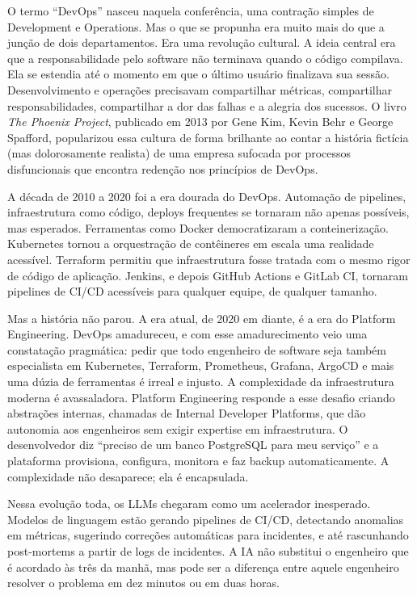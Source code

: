 O termo ``DevOps'' nasceu naquela conferência, uma contração simples de
Development e Operations. Mas o que se propunha era muito mais do que a
junção de dois departamentos. Era uma revolução cultural. A ideia central era que
a responsabilidade pelo software não terminava quando o código compilava. Ela se
estendia até o momento em que o último usuário finalizava sua sessão. Desenvolvimento
e operações precisavam compartilhar métricas, compartilhar responsabilidades,
compartilhar a dor das falhas e a alegria dos sucessos. O livro \emph{The Phoenix
Project}, publicado em 2013 por Gene Kim, Kevin Behr e George Spafford, popularizou
essa cultura de forma brilhante ao contar a história fictícia (mas dolorosamente
realista) de uma empresa sufocada por processos disfuncionais que encontra redenção
nos princípios de DevOps.

A década de 2010 a 2020 foi a era dourada do DevOps. Automação de pipelines,
infraestrutura como código, deploys frequentes se tornaram não apenas possíveis, mas
esperados. Ferramentas como Docker democratizaram a conteinerização. Kubernetes
tornou a orquestração de contêineres em escala uma realidade acessível. Terraform
permitiu que infraestrutura fosse tratada com o mesmo rigor de código de aplicação.
Jenkins, e depois GitHub Actions e GitLab CI, tornaram pipelines de CI/CD acessíveis
para qualquer equipe, de qualquer tamanho.

Mas a história não parou. A era atual, de 2020 em diante, é a era do Platform
Engineering. DevOps amadureceu, e com esse amadurecimento veio uma constatação
pragmática: pedir que todo engenheiro de software seja também especialista em
Kubernetes, Terraform, Prometheus, Grafana, ArgoCD e mais uma dúzia de ferramentas
é irreal e injusto. A complexidade da infraestrutura moderna é avassaladora.
Platform Engineering responde a esse desafio criando abstrações internas,
chamadas de Internal Developer Platforms, que dão autonomia aos engenheiros sem
exigir expertise em infraestrutura. O desenvolvedor diz ``preciso de um
banco PostgreSQL para meu serviço'' e a plataforma provisiona, configura, monitora
e faz backup automaticamente. A complexidade não desaparece; ela é encapsulada.

Nessa evolução toda, os LLMs chegaram como um acelerador inesperado. Modelos de
linguagem estão gerando pipelines de CI/CD, detectando anomalias em métricas,
sugerindo correções automáticas para incidentes, e até rascunhando post-mortems
a partir de logs de incidentes. A IA não substitui o engenheiro que é acordado
às três da manhã, mas pode ser a diferença entre aquele engenheiro resolver o
problema em dez minutos ou em duas horas.


